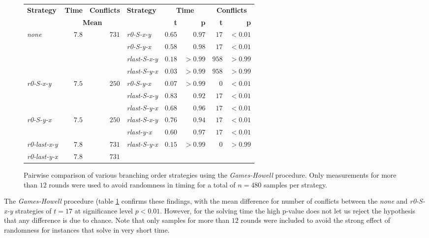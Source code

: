 \begin{figure}
\centering \begin{tabular}{lrr @{\hskip 1cm} lrrrr}
\textbf{Strategy} & \textbf{Time} & \textbf{Conflicts} & \textbf{Strategy} & \multicolumn{2}{c}{\textbf{Time}} & \multicolumn{2}{c}{\textbf{Conflicts}} \\
& \multicolumn{2}{c}{\textbf{Mean}} & & \textbf{t} & \textbf{p} & \textbf{t} & \textbf{p} \\ \hline
\emph{none} & $7.8$ & $731$ & \emph{r0-S-x-y} & $0.65$ & $0.97$ & $17$ & $<0.01$ \\
& & & \emph{r0-S-y-x} & $0.58$ & $0.98$ & $17$ & $<0.01$ \\
& & & \emph{rlast-S-x-y} & $0.18$ & $>0.99$ & $958$ & $>0.99$ \\
& & & \emph{rlast-S-y-x} & $0.03$ & $>0.99$ & $958$ & $>0.99$ \\ \hline
\emph{r0-S-x-y} & $7.5$ & $250$ & \emph{r0-S-y-x} & $0.07$ & $>0.99$ & $0$ & $<0.01$ \\	
& & & \emph{rlast-S-x-y} & $0.83$ & $0.92$ & $17$ & $<0.01$ \\
& & & \emph{rlast-S-y-x} & $0.68$ & $0.96$ & $17$ & $<0.01$ \\ \hline
\emph{r0-S-y-x} & $7.5$ & $250$ & \emph{rlast-S-x-y} & $0.76$ & $0.94$ & $17$ & $<0.01$ \\
& & & \emph{rlast-y-x} & $0.60$ & $0.97$ & $17$ & $<0.01$ \\ \hline
\emph{r0-last-x-y} & $7.8$ & $731$ & \emph{rlast-S-y-x} & $0.15$ & $>0.99$ & $0$ & $>0.99$ \\ \hline
\emph{r0-last-y-x} & $7.8$ & $731$ & & & & &  \\
\end{tabular}
\caption{Pairwise comparison of various branching order strategies using the \emph{Games-Howell} procedure. Only measurements for more than $12$ rounds were used to avoid randomness in timing for a total of $n=480$ samples per strategy.}
\label{tbl:gh-sha3-bos}
\end{figure}

The \emph{Games-Howell} procedure (table \ref{tbl:gh-sha3-bos} confirms these findings, with the mean difference for number of conflicts between the \emph{none} and \emph{r0-S-x-y} strategies of $t = 17$ at significance level $p < 0.01$.
However, for the solving time the high p-value does not let us reject the hypothesis that any difference is due to chance.
Note that only samples for more than $12$ rounds were included to avoid the strong effect of randomness for instances that solve in very short time.

